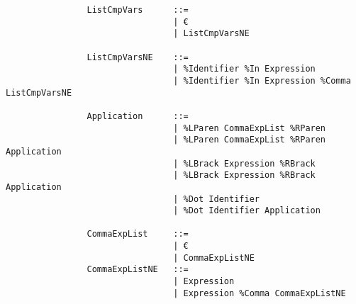 \documentclass{article}
\begin{document}
\begin{verbatim}
				ListCmpVars      ::=
				                 | €
				                 | ListCmpVarsNE
				                 
				ListCmpVarsNE    ::=
				                 | %Identifier %In Expression
				                 | %Identifier %In Expression %Comma ListCmpVarsNE
				                 
				Application      ::=
				                 | %LParen CommaExpList %RParen
				                 | %LParen CommaExpList %RParen Application
				                 | %LBrack Expression %RBrack
				                 | %LBrack Expression %RBrack Application
				                 | %Dot Identifier
				                 | %Dot Identifier Application
				
				CommaExpList     ::=
				                 | €
				                 | CommaExpListNE
				CommaExpListNE   ::=
				                 | Expression
				                 | Expression %Comma CommaExpListNE
			\end{verbatim}
	
\end{document}
